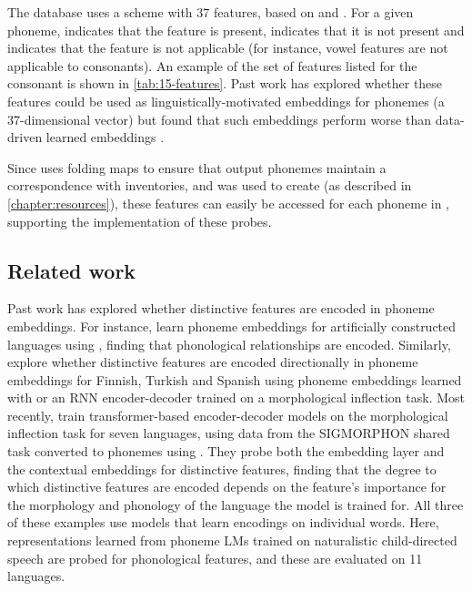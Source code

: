 The \phoible database uses a scheme with 37 features, based on \citet{hayes2011introductory} and \citet{moisik2011whole}. For a given phoneme, \ex{+} indicates that the feature is present, \ex{-} indicates that it is not present and  indicates that the feature is not applicable (for instance, vowel features are not applicable to consonants). An example of the set of features listed for the consonant  is shown in \cref{tab:15-features}. Past work has explored whether these features could be used as linguistically-motivated embeddings for phonemes (a 37-dimensional vector) but found that such embeddings perform worse than data-driven learned embeddings \citep{sofroniev-coltekin-2018-phonetic}.

Since \gpp uses folding maps to ensure that output phonemes maintain a correspondence with \phoible inventories, and \gpp was used to create \ipachildes (as described in \cref{chapter:resources}), these features can easily be accessed for each phoneme in \ipachildes, supporting the implementation of these probes.

\subsection{Related work}

Past work has explored whether distinctive features are encoded in phoneme embeddings. For instance, \citet{kolachina-magyar-2019-phone} learn phoneme embeddings for artificially constructed languages using , finding that phonological relationships are encoded. Similarly, \citet{silfverberg2018sound} explore whether distinctive features are encoded directionally in phoneme embeddings for Finnish, Turkish and Spanish using phoneme embeddings learned with  or an RNN encoder-decoder trained on a morphological inflection task. Most recently, \citet{astrach2025probing} train transformer-based encoder-decoder models on the morphological inflection task for seven languages, using data from the SIGMORPHON shared task \citep{cotterell-etal-2017-conll} converted to phonemes using . They probe both the embedding layer and the contextual embeddings for distinctive features, finding that the degree to which distinctive features are encoded depends on the feature's importance for the morphology and phonology of the language the model is trained for. All three of these examples use models that learn encodings on individual words. Here, representations learned from phoneme LMs trained on naturalistic child-directed speech are probed for phonological features, and these are evaluated on 11 languages.

